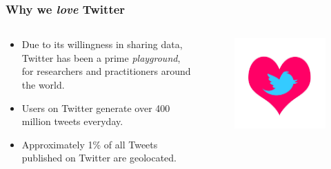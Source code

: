 \documentclass[hyperref={pdfpagelabels=true}]{beamer}
\begin{document}
\begin{frame}
\frametitle{Why we \textit{love} Twitter}
\begin{columns}
  \begin{column}{0.7\textwidth}\small{ 
  \begin{itemize}    
    \item<1->Due to its willingness in sharing data, Twitter has been a prime \textit{playground}, for researchers and practitioners around the world.
      \item<1->Users on Twitter generate over 400 million tweets everyday.%
      \item<1->Approximately 1\% of all Tweets published on Twitter are geolocated.    
  \end{itemize} }
  \end{column}
  \begin{column}{0.3\textwidth}        
    \begin{figure}   
      \includegraphics[width=\textwidth]{love.jpg}   
    \end{figure}     
  \end{column}  
\end{columns}    
\end{frame}
\end{document}
